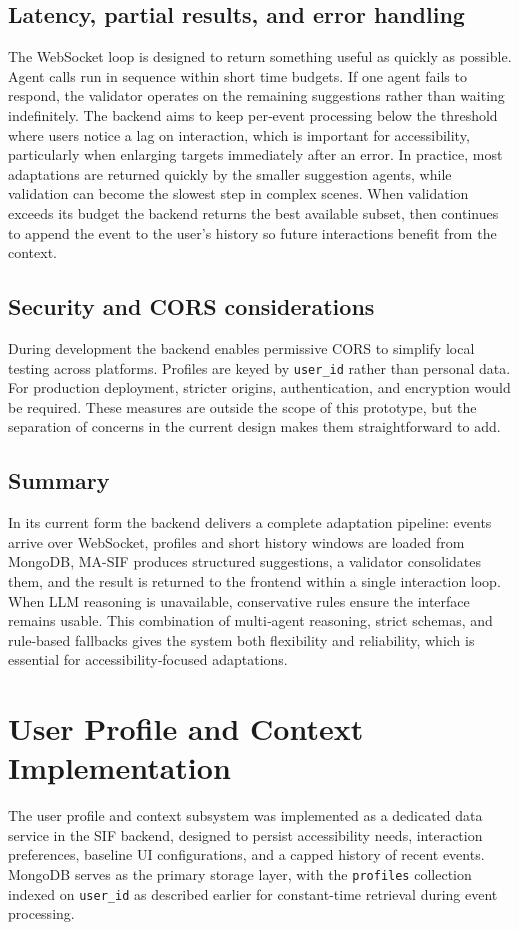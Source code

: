 \subsection{Latency, partial results, and error handling}
The WebSocket loop is designed to return something useful as quickly as possible. Agent calls run in sequence within short time budgets. If one agent fails to respond, the validator operates on the remaining suggestions rather than waiting indefinitely. The backend aims to keep per‑event processing below the threshold where users notice a lag on interaction, which is important for accessibility, particularly when enlarging targets immediately after an error. In practice, most adaptations are returned quickly by the smaller suggestion agents, while validation can become the slowest step in complex scenes. When validation exceeds its budget the backend returns the best available subset, then continues to append the event to the user’s history so future interactions benefit from the context.

\subsection{Security and CORS considerations}
During development the backend enables permissive CORS to simplify local testing across platforms. Profiles are keyed by \texttt{user\_id} rather than personal data. For production deployment, stricter origins, authentication, and encryption would be required. These measures are outside the scope of this prototype, but the separation of concerns in the current design makes them straightforward to add.

\subsection{Summary}
In its current form the backend delivers a complete adaptation pipeline: events arrive over WebSocket, profiles and short history windows are loaded from MongoDB, MA-SIF produces structured suggestions, a validator consolidates them, and the result is returned to the frontend within a single interaction loop. When LLM reasoning is unavailable, conservative rules ensure the interface remains usable. This combination of multi‑agent reasoning, strict schemas, and rule-based fallbacks gives the system both flexibility and reliability, which is essential for accessibility‑focused adaptations.

\section{User Profile and Context Implementation}
The user profile and context subsystem was implemented as a dedicated data service in the SIF backend, designed to persist accessibility needs, interaction preferences, baseline UI configurations, and a capped history of recent events. MongoDB serves as the primary storage layer, with the \texttt{profiles} collection indexed on \texttt{user\_id} as described earlier for constant-time retrieval during event processing.

